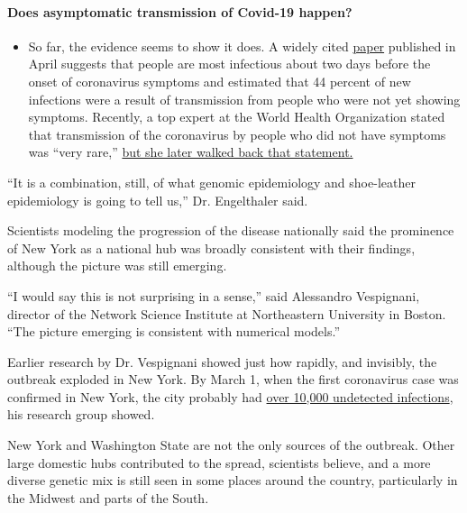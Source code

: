 \begin{itemize}
{  \paragraph{Does asymptomatic transmission of Covid-19
  happen?}\label{does-asymptomatic-transmission-of-covid-19-happen}}

  \begin{itemize}
  \tightlist
  \item
    So far, the evidence seems to show it does. A widely cited
    \href{https://www.nature.com/articles/s41591-020-0869-5}{paper}
    published in April suggests that people are most infectious about
    two days before the onset of coronavirus symptoms and estimated that
    44 percent of new infections were a result of transmission from
    people who were not yet showing symptoms. Recently, a top expert at
    the World Health Organization stated that transmission of the
    coronavirus by people who did not have symptoms was ``very rare,''
    \href{https://www.nytimes.com/2020/06/09/world/coronavirus-updates.html?action=click\&pgtype=Article\&state=default\&region=MAIN_CONTENT_3\&context=storylines_faq\#link-1f302e21}{but
    she later walked back that statement.}
  \end{itemize}
\end{itemize}

``It is a combination, still, of what genomic epidemiology and
shoe-leather epidemiology is going to tell us,'' Dr. Engelthaler said.

Scientists modeling the progression of the disease nationally said the
prominence of New York as a national hub was broadly consistent with
their findings, although the picture was still emerging.

``I would say this is not surprising in a sense,'' said Alessandro
Vespignani, director of the Network Science Institute at Northeastern
University in Boston. ``The picture emerging is consistent with
numerical models.''

Earlier research by Dr. Vespignani showed just how rapidly, and
invisibly, the outbreak exploded in New York. By March 1, when the first
coronavirus case was confirmed in New York, the city probably had
\href{https://www.nytimes.com/2020/04/23/us/coronavirus-early-outbreaks-cities.html}{over
10,000 undetected infections}, his research group showed.

New York and Washington State are not the only sources of the outbreak.
Other large domestic hubs contributed to the spread, scientists believe,
and a more diverse genetic mix is still seen in some places around the
country, particularly in the Midwest and parts of the South.


